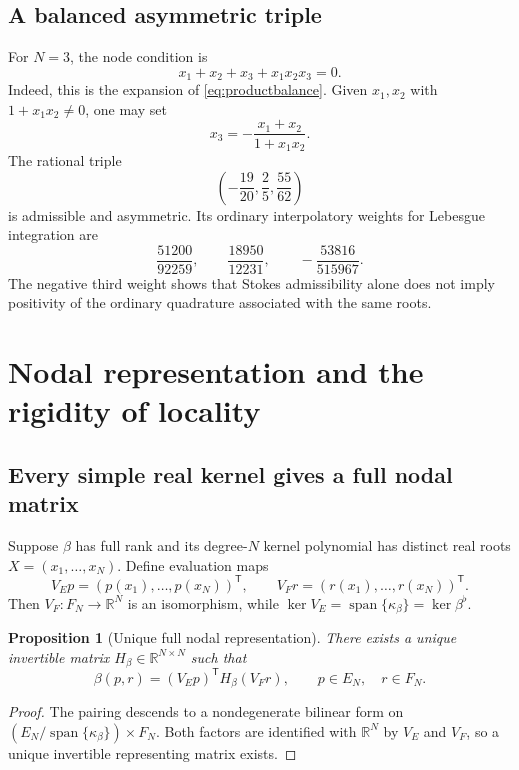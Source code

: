 \documentclass[11pt,a4paper]{article}
\newtheorem{proposition}[theorem]{Proposition}
\theoremstyle{definition}
\theoremstyle{remark}
\newcommand{\R}{\mathbb{R}}
\newcommand{\Ker}{\operatorname{ker}}
\newcommand{\spanof}{\operatorname{span}}
\begin{document}
\subsection{A balanced asymmetric triple}

For $N=3$, the node condition is
\begin{equation}\label{eq:N3condition}
 x_1+x_2+x_3+x_1x_2x_3=0.
\end{equation}
Indeed, this is the expansion of \eqref{eq:productbalance}.  Given $x_1,x_2$ with
$1+x_1x_2\neq0$, one may set
\[
 x_3=-\frac{x_1+x_2}{1+x_1x_2}.
\]
The rational triple
\begin{equation}\label{eq:rationaltriple}
 \left(-\frac{19}{20},\frac25,\frac{55}{62}\right)
\end{equation}
is admissible and asymmetric.  Its ordinary interpolatory weights for Lebesgue integration
are
\[
 \frac{51200}{92259},\qquad
 \frac{18950}{12231},\qquad
 -\frac{53816}{515967}.
\]
The negative third weight shows that Stokes admissibility alone does not imply positivity of
the ordinary quadrature associated with the same roots.

\section{Nodal representation and the rigidity of locality}

\subsection{Every simple real kernel gives a full nodal matrix}

Suppose $\beta$ has full rank and its degree-$N$ kernel polynomial has distinct real roots
$X=(x_1,\ldots,x_N)$.  Define evaluation maps
\[
 V_Ep=(p(x_1),\ldots,p(x_N))^{\mathsf T},
 \qquad
 V_Fr=(r(x_1),\ldots,r(x_N))^{\mathsf T}.
\]
Then $V_F:F_N\to\R^N$ is an isomorphism, while
$\Ker V_E=\spanof\{\kappa_\beta\}=\Ker\beta^\flat$.

\begin{proposition}[Unique full nodal representation]\label{prop:fullnodal}
There exists a unique invertible matrix $H_\beta\in\R^{N\times N}$ such that
\begin{equation}\label{eq:fullnodal}
 \boxed{\beta(p,r)=(V_Ep)^{\mathsf T}H_\beta(V_Fr),}
 \qquad p\in E_N,\quad r\in F_N.
\end{equation}
\end{proposition}

\begin{proof}
The pairing descends to a nondegenerate bilinear form on
$(E_N/\spanof\{\kappa_\beta\})\times F_N$.  Both factors are identified with $\R^N$ by
$V_E$ and $V_F$, so a unique invertible representing matrix exists.
\end{proof}
\end{document}
